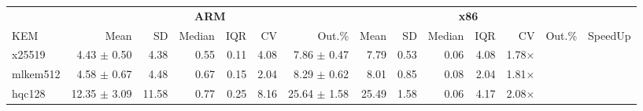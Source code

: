 \begin{table}[!ht]
\centering
\begin{tabular}{l|rrrrrr|rrrrrr|r}
\toprule
& \multicolumn{6}{c}{\bfseries ARM} & \multicolumn{6}{c}{\bfseries x86} & \\
\cmidrule(lr){2-7} \cmidrule(lr){8-13}
KEM & Mean & SD & Median & IQR & CV & Out.\% & Mean & SD & Median & IQR & CV & Out.\% & SpeedUp \\
\midrule
x25519 		& 4.43 $\pm$ 0.50 & 4.38 & 0.55 & 0.11 & 4.08 & 7.86 $\pm$ 0.47 & 7.79 & 0.53 & 0.06 & 4.08 & 1.78× \\
mlkem512		& 4.58 $\pm$ 0.67 & 4.48 & 0.67 & 0.15 & 2.04 & 8.29 $\pm$ 0.62 & 8.01 & 0.85 & 0.08 & 2.04 & 1.81× \\
hqc128 		& 12.35 $\pm$ 3.09 & 11.58 & 0.77 & 0.25 & 8.16 & 25.64 $\pm$ 1.58 & 25.49 & 1.58 & 0.06 & 4.17 & 2.08× \\
\bottomrule
\end{tabular}
\end{table}

